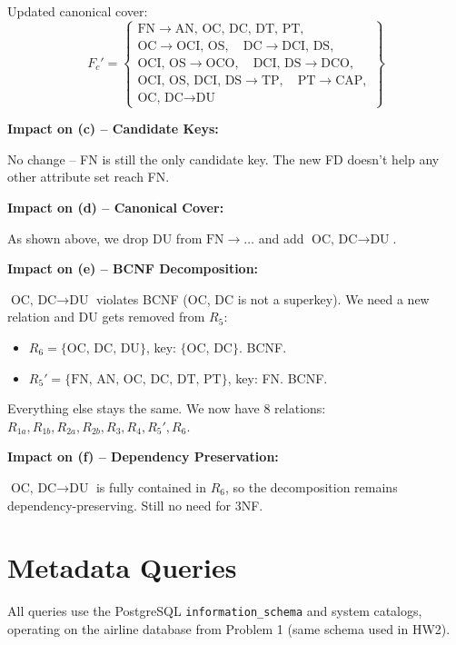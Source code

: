 \documentclass[11pt]{article}
\begin{document}
Updated canonical cover:
\[
F_c' = \left\{\begin{array}{l}
\text{FN} \to \text{AN, OC, DC, DT, PT}, \\
\text{OC} \to \text{OCI, OS},\quad \text{DC} \to \text{DCI, DS}, \\
\text{OCI, OS} \to \text{OCO},\quad \text{DCI, DS} \to \text{DCO}, \\
\text{OCI, OS, DCI, DS} \to \text{TP},\quad \text{PT} \to \text{CAP}, \\
\text{OC, DC} \to \text{DU}
\end{array}\right\}
\]

\noindent\textbf{Impact on (c) -- Candidate Keys:}

No change -- FN is still the only candidate key. The new FD doesn't help any other attribute set reach FN.

\noindent\textbf{Impact on (d) -- Canonical Cover:}

As shown above, we drop DU from $\text{FN} \to \ldots$ and add $\text{OC, DC} \to \text{DU}$.

\noindent\textbf{Impact on (e) -- BCNF Decomposition:}

$\text{OC, DC} \to \text{DU}$ violates BCNF (OC, DC is not a superkey). We need a new relation and DU gets removed from $R_5$:

\begin{itemize}
  \item $R_6 = \{\text{OC, DC, DU}\}$, key: $\{$OC, DC$\}$. BCNF. \checkmark
  \item $R_5' = \{\text{FN, AN, OC, DC, DT, PT}\}$, key: FN. BCNF. \checkmark
\end{itemize}

Everything else stays the same. We now have 8 relations: $R_{1a}, R_{1b}, R_{2a}, R_{2b}, R_3, R_4, R_5', R_6$.

\noindent\textbf{Impact on (f) -- Dependency Preservation:}

$\text{OC, DC} \to \text{DU}$ is fully contained in $R_6$, so the decomposition remains dependency-preserving. Still no need for 3NF.


\section{Metadata Queries}

All queries use the PostgreSQL \texttt{information\_schema} and system catalogs, operating on the airline database from Problem 1 (same schema used in HW2).
\end{document}
